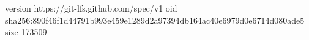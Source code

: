version https://git-lfs.github.com/spec/v1
oid sha256:890f46f1d44791b993e459e1289d2a97394db164ac40e6979d0e6714d080ade5
size 173509
